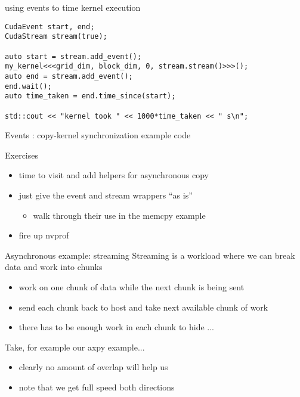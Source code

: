 \begin{frame}[fragile]{}
    \begin{code}{using events to time kernel execution}
        \begin{lstlisting}[style=boxcudatiny]
CudaEvent start, end;
CudaStream stream(true);

auto start = stream.add_event();
my_kernel<<<grid_dim, block_dim, 0, stream.stream()>>>();
auto end = stream.add_event();
end.wait();
auto time_taken = end.time_since(start);

std::cout << "kernel took " << 1000*time_taken << " s\n";
        \end{lstlisting}
    \end{code}
\end{frame}
\begin{frame}[fragile]{Events : copy-kernel synchronization example}
    code
\end{frame}

\begin{frame}[fragile]{Exercises}
    \begin{itemize}
        \item time to visit  and add helpers for asynchronous copy
        \item just give the event and stream wrappers ``as is''
        \begin{itemize}
            \item walk through their use in the memcpy example
        \end{itemize}
        \item fire up nvprof
    \end{itemize}
\end{frame}

\begin{frame}[fragile]{Asynchronous example: streaming}
    Streaming is a workload where we can break data and work into chunks
    \begin{itemize}
        \item work on one chunk of data while the next chunk is being sent
        \item send each chunk back to host and take next available chunk of work
        \item there has to be enough work in each chunk to hide ...
    \end{itemize}

    Take, for example our axpy example...
    \begin{itemize}
        \item clearly no amount of overlap will help us
        \item note that we get full speed both directions
    \end{itemize}
\end{frame}

